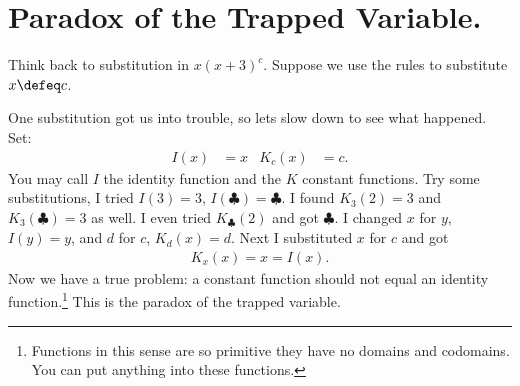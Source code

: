 
\chapter{Paradox of the Trapped Variable.}
Think back to substitution in $x(x+3)^c$.  Suppose we use 
the rules to substitute $x\defeq c$.
\begin{center}
\end{center}

One substitution got us into trouble, so lets slow down to see what happened.  Set:
\begin{align*}
    I(x) & = x & 
    K_c(x) & = c.
\end{align*}
You may call $I$ the identity function and the $K$ constant functions.
Try some substitutions, I tried $I(3)=3$, $I(\clubsuit)=\clubsuit$.
I found $K_3(2)=3$ and $K_3(\clubsuit)=3$ as well.  I even tried 
$K_{\clubsuit}(2)$ and got $\clubsuit$.  I changed $x$ for $y$, 
$I(y)=y$, and $d$ for $c$, $K_d(x)=d$. Next I substituted $x$ for $c$ and got
\begin{align*}
    K_x(x)=x=I(x).
\end{align*}
Now we have a true problem: a constant function should not equal 
an identity function.\footnote{Functions in this sense are so primitive 
they have no domains and codomains.  You can put anything into these functions.}
This is the paradox of the trapped variable.

